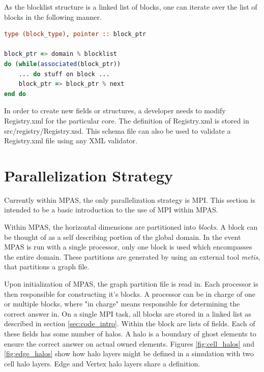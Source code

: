 \documentclass[11pt]{report}
\begin{document}
As the blocklist structure is a linked list of blocks, one can iterate over the
list of blocks in the following manner.

\begin{lstlisting}[language=fortran,escapechar=@,frame=single]
type (block_type), pointer :: block_ptr

block_ptr => domain % blocklist
do (while(associated(block_ptr))
	... do stuff on block ...
	block_ptr => block_ptr % next
end do
\end{lstlisting}

In order to create new fields or structures, a developer needs to modify
Registry.xml for the particular core. The definition of Registry.xml is stored
in src/registry/Registry.xsd. This schema file can also be used to validate a
Registry.xml file using any XML validator.


\section{Parallelization Strategy}
Currently within MPAS, the only parallelization strategy is MPI. This section
is intended to be a basic introduction to the use of MPI within MPAS.

Within MPAS, the horizontal dimensions are partitioned into {\it blocks}. A
block can be thought of as a self describing portion of the global domain. In
the event MPAS is run with a single processor, only one block is used which
encompasses the entire domain. These partitions are generated by using an
external tool {\it metis}, that partitions a graph file.

Upon initialization of MPAS, the graph partition file is read in. Each
processor is then responsible for constructing it's blocks. A processor can be
in charge of one or multiple blocks, where "in charge" means responsible for
determining the correct answer in. On a single MPI task, all blocks are stored
in a linked list as described in section \ref{sec:code_intro}. Within the block
are lists of fields. Each of these fields has some number of halos. A halo is a
boundary of ghost elements to ensure the correct answer on actual owned
elements. Figures \ref{fig:cell_halos} and \ref{fig:edge_halos} show how halo
layers might be defined in a simulation with two cell halo layers. Edge and
Vertex halo layers share a definition.
\end{document}
